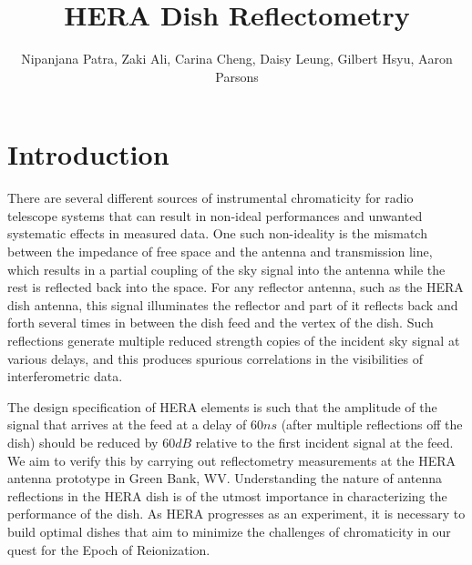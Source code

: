 \documentclass[12pt,preprint]{aastex}
\begin{document}
\title{HERA Dish Reflectometry} 
\author{Nipanjana Patra, Zaki Ali, Carina Cheng, Daisy Leung, Gilbert Hsyu, Aaron Parsons}
\maketitle

\section{Introduction}

There are several different sources of instrumental chromaticity for radio
telescope systems that can result in non-ideal performances and unwanted
systematic effects in measured data. One such non-ideality is the mismatch
between the impedance of free space and the antenna and transmission line,
which results in a partial coupling of the sky signal into the antenna while
the rest is reflected back into the space. For any reflector antenna, such as the HERA
dish antenna, this signal illuminates the reflector and part of it reflects
back and forth several times in between the dish feed and the vertex of the
dish.  Such reflections generate multiple reduced strength copies of the
incident sky signal at various delays, and this produces spurious correlations
in the visibilities of interferometric data. 

The design specification of HERA elements is such that the amplitude of the
signal that arrives at the feed at a delay of $60ns$ (after multiple
reflections off the dish) should be reduced by $60dB$ relative to the first
incident signal at the feed. We aim to verify this by carrying out reflectometry measurements at the HERA antenna prototype in Green Bank, WV.
Understanding the nature of antenna reflections in the HERA dish is of the
utmost importance in characterizing the performance of the dish. As HERA
progresses as an experiment, it is necessary to build optimal dishes that aim
to minimize the challenges of chromaticity in our quest for the Epoch of
Reionization.
\end{document}
